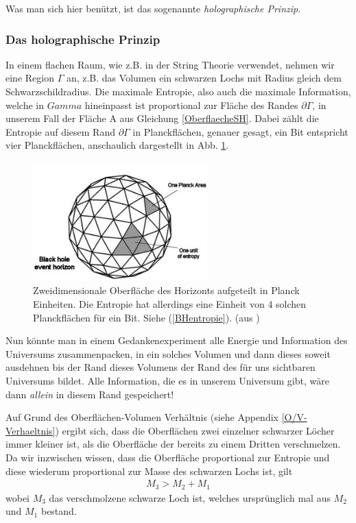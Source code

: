 \documentclass[ngerman]{scrartcl}
\begin{document}
	Was man sich hier benützt, ist das sogenannte \textit{holographische Prinzip}.
	
\subsubsection*{Das holographische Prinzip}
	In einem flachen Raum, wie z.B. in der String Theorie verwendet, nehmen wir eine Region $\Gamma$ an, z.B. das Volumen ein schwarzen Lochs mit Radius gleich dem Schwarzschildradius. 
	Die maximale Entropie, also auch die maximale Information, welche in $Gamma$ hineinpasst ist proportional zur Fläche des Randes $\partial \Gamma$, in unserem Fall der Fläche A aus Gleichung \eqref{OberflaecheSH}.
	Dabei zählt die Entropie auf diesem Rand $\partial \Gamma$ in Planckflächen, genauer gesagt, ein Bit entspricht vier Planckflächen, anschaulich dargestellt in Abb. \ref{holoPrinzip}.
	\begin{figure} [h] 
		\begin{center}
			\includegraphics[width=0.6\textwidth]{BHentropy1}
		\end{center}
		\caption{Zweidimensionale Oberfläche des Horizonts aufgeteilt in Planck Einheiten. Die Entropie hat allerdings eine Einheit von 4 solchen Planckflächen für ein Bit. Siehe (\ref{BHentropie}). (aus \cite{BekensteinHawking})} \label{holoPrinzip}
	\end{figure} 
	
	Nun könnte man in einem Gedankenexperiment alle Energie und Information des Universums zusammenpacken, in ein solches Volumen und dann dieses soweit ausdehnen bis der Rand dieses Volumens der Rand des für uns sichtbaren Universums bildet. Alle Information, die es in unserem Universum gibt, wäre dann \textit{allein} in diesem Rand gespeichert!
	
	Auf Grund des Oberflächen-Volumen Verhältnis (siehe Appendix \ref{O/V-Verhaeltnis}) ergibt sich, dass die Oberflächen zwei einzelner schwarzer Löcher immer kleiner ist, als die Oberfläche der bereits zu einem Dritten verschmelzen. Da wir inzwischen wissen, dass die Oberfläche proportional zur Entropie und diese wiederum proportional zur Masse des schwarzen Lochs ist, gilt 
		\begin{align}
			M_3 > M_2 + M_1
		\end{align} 
	wobei $M_3$ das verschmolzene schwarze Loch ist, welches ursprünglich mal aus $M_2$ und $M_1$ bestand. 
\end{document}
